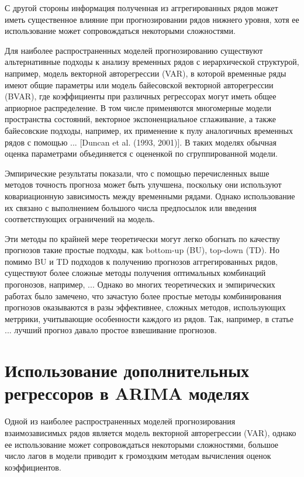 \documentclass[12pt,a4paper, oneside]{extreport}
\begin{document}
С другой стороны информация полученная из аггрегированных рядов может иметь существенное влияние при прогнозировании рядов нижнего уровня, хотя ее использование может сопровождаться некоторыми сложностями. 

Для наиболее распространенных моделей прогнозированию существуют альтернативные подходы к анализу временных рядов с иерархической структурой, например, модель  векторной авторегрессии (VAR), в которой  временные ряды имеют общие параметры или модель байесовской векторной авторегрессии (BVAR), где коэффициенты  при различных регрессорах могут иметь общее априорное распределение.  В том числе применяются многомерные модели пространства состояний, векторное  экспоненциальное сглаживание, а также  байесовские подходы, например, их применение к пулу аналогичных временных рядов с помощью ... [Duncan et al. (1993, 2001)].
В таких моделях обычная оценка параметрами объединяется с оцененкой по сгруппированной модели. 

Эмпирические результаты показали, что с помощью перечисленных выше методов точность прогноза может быть улучшена, поскольку они используют ковариационную зависимость  между временными рядами. Однако использование их связано с выполнением большого числа предпосылок или введения соответствующих ограничений на модель.


Эти методы по крайней мере теоретически могут легко обогнать по качеству прогнозов такие простые подходы, как bottom-up (BU), top-down (TD).
Но помимо BU и TD подходов к получению прогнозов аггрегированных рядов, существуют более сложные методы получения  оптимальных комбинаций прогонозов, например, ...
Однако во многих теоретических и эмпирических работах было замечено, что зачастую более простые методы комбинирования прогнозов оказываются в разы эффективнее, сложных методов, использующих метррики, учитывающие особенности каждого из рядов. Так, например, в статье ... лучший прогноз давало простое взвешивание прогнозов. 



\section{Использование дополнительных регрессоров в ARIMA моделях}

Одной из наиболее распространенных моделей прогнозирования взаимозависимых рядов является модель векторной авторегрессии (VAR), однако ее использование может сопровождаться некоторыми сложностями, большое число лагов в модели приводит к громоздким методам вычисления оценок коэффициентов.  
\end{document}
